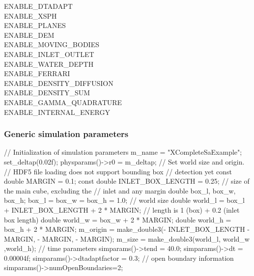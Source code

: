 \documentclass{../GPUSPHtemplate}
\begin{document}
\begin{enumerate}
ENABLE\_DTADAPT \\
ENABLE\_XSPH \\
ENABLE\_PLANES \\
ENABLE\_DEM \\
ENABLE\_MOVING\_BODIES \\
ENABLE\_INLET\_OUTLET \\
ENABLE\_WATER\_DEPTH \\
ENABLE\_FERRARI \\
ENABLE\_DENSITY\_DIFFUSION \\
ENABLE\_DENSITY\_SUM \\
ENABLE\_GAMMA\_QUADRATURE \\
ENABLE\_INTERNAL\_ENERGY\\
\end{enumerate}

\subsubsection{Generic simulation parameters}

\begin{ccode}
// Initialization of simulation parameters
m_name = "XCompleteSaExample";
set_deltap(0.02f);
physparams()->r0 = m_deltap;
// Set world size and origin.
// HDF5 file loading does not support bounding box 
// detection yet
const double MARGIN = 0.1;
const double INLET_BOX_LENGTH = 0.25;
// size of the main cube, excluding the 
// inlet and any margin
double box_l, box_w, box_h;
box_l = box_w = box_h = 1.0;
// world size
double world_l = box_l + INLET_BOX_LENGTH 
    + 2 * MARGIN; // length is 1 (box) + 0.2 (inlet box length)
double world_w = box_w + 2 * MARGIN;
double world_h = box_h + 2 * MARGIN;
m_origin = make_double3(- INLET_BOX_LENGTH - MARGIN,
    - MARGIN, - MARGIN);
m_size = make_double3(world_l, world_w ,world_h);
// time parameters
simparams()->tend = 40.0;
simparams()->dt = 0.00004f;
simparams()->dtadaptfactor = 0.3;
// open boundary information
simparams()->numOpenBoundaries=2;
\end{ccode}
\end{document}
